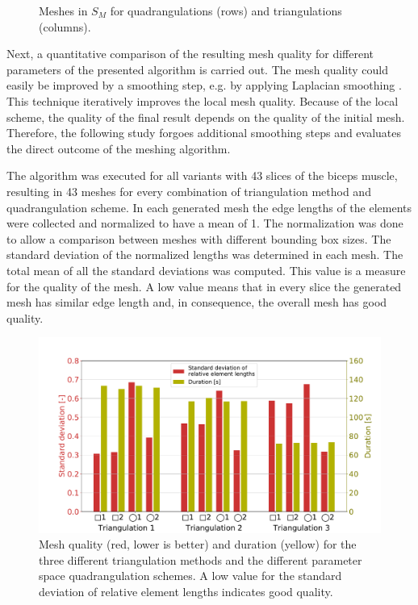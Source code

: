 \begin{figure}
\begin{subfigure}[t]{0.24\textwidth}
    \label{fig:tri_23}%
  \end{subfigure}
  \caption{Meshes in $S_M$ for quadrangulations (rows) and triangulations (columns).}%
  \label{fig:tri_meshes}%
\end{figure}%

Next, a quantitative comparison of the resulting mesh quality for different parameters of the presented algorithm is carried out. The mesh quality could easily be improved by a smoothing step, e.g. by applying Laplacian smoothing \cite{field1988laplacianSmoothingAndDelaunayTriangulations}. This technique iteratively improves the local mesh quality. Because of the local scheme, the quality of the final result depends on the quality of the initial mesh. Therefore, the following study forgoes additional smoothing steps and evaluates the direct outcome of the meshing algorithm.

The algorithm was executed for all variants with 43 slices of the biceps muscle, resulting in 43 meshes for every combination of triangulation method and quadrangulation scheme. In each generated mesh the edge lengths of the elements were collected and normalized to have a mean of 1. 
The normalization was done to allow a comparison between meshes with different bounding box sizes.
The standard deviation of the normalized lengths was determined in each mesh. The total mean of all the standard deviations was computed. This value is a measure for the quality of the mesh. A low value means that in every slice the generated mesh has similar edge length and, in consequence, the overall mesh has good quality.

\begin{figure}%
  \centering%
  \includegraphics[width=\textwidth]{images/fiber_creation/mesh_quality.pdf}%
  \caption{Mesh quality (red, lower is better) and duration (yellow) for the three different triangulation methods and the different parameter space quadrangulation schemes. A low value for the standard deviation of relative element lengths indicates good quality.}%
  \label{fig:mesh_quality}%
\end{figure}

